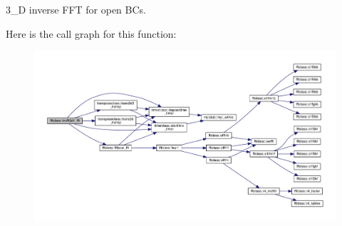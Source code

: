 3\+\_\+D inverse F\+FT for open B\+Cs. 

Here is the call graph for this function\+:\nopagebreak
\begin{figure}[H]
\begin{center}
\leavevmode
\includegraphics[width=350pt]{namespacefftclass_a21e8a7bd2877ec439bc4f0e0bc0e4681_cgraph}
\end{center}
\end{figure}
\mbox{\label{namespacefftclass_a374c599138aeca237d4c303a07a470ee}} 
